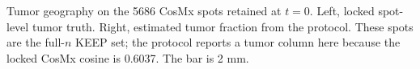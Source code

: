 Tumor geography on the 5686 CosMx spots retained at \(t=0\). Left, locked spot-level tumor truth. Right, estimated tumor fraction from the protocol. These spots are the full-\(n\) KEEP set; the protocol reports a tumor column here because the locked CosMx cosine is 0.6037. The bar is 2 mm.

